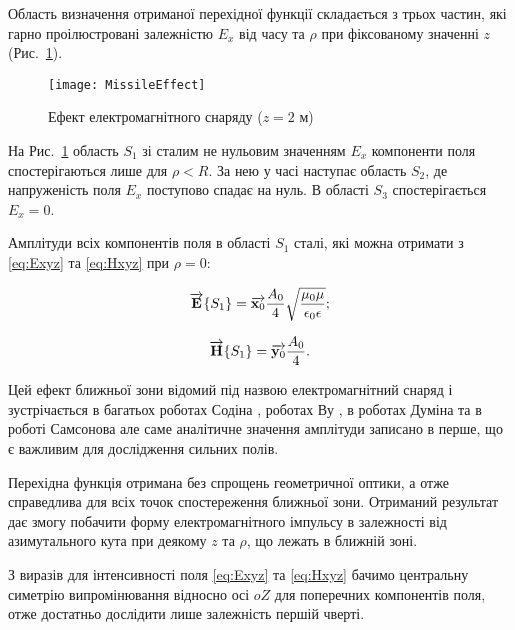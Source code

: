 Область визначення отриманої перехідної функції складається з трьох частин, 
які гарно проілюстровані залежністю $ E_x $ від часу та $ \rho $ при 
фіксованому значенні $ z $ (Рис.~\ref{fig:emp_rho}).
 
\begin{figure}[h] \begin{center}
\texttt{[image: MissileEffect]}
\caption{Ефект електромагнітного снаряду ($ z = 2 $ м)} \label{fig:emp_rho}
\end{center} \end{figure}

На Рис.~\ref{fig:emp_rho} область $ S_1 $ зі сталим не нульовим значенням 
$ E_x $ компоненти поля спостерігаються лише для $ \rho < R $. За нею у 
часі наступає область $ S_2 $, де напруженість поля $ E_x $ поступово спадає 
на нуль. В області $ S_3 $ спостерігається $ E_x = 0 $.

Амплітуди всіх компонентів поля в області $ S_1 $ сталі, які можна отримати
з \eqref{eq:Exyz} та \eqref{eq:Hxyz} при $ \rho = 0 $:

\begin{equation*} \begin{aligned}
\overrightarrow{\mathbf E} \{ S_1 \} = 
\overrightarrow{\mathbf x_0} \frac{A_0}{4} 
\sqrt{\frac{\mu_0 \mu}{\epsilon_0 \epsilon}};
\end{aligned} \end{equation*}

\begin{equation*} \begin{aligned}
\overrightarrow{\mathbf H} \{ S_1 \} = \overrightarrow{\mathbf y_0} \frac{A_0}{4}.
\end{aligned} \end{equation*}

Цей ефект ближньої зони відомий під назвою електромагнітний снаряд і
зустрічається в багатьох роботах Содіна \cite{imp:Sodin1991, 
imp:Sodin1992-5, imp:Sodin1992-10, imp:Sodin1997}, роботах Ву 
\cite{imp:Wu1985, imp:Wu1987, imp:Wu1991}, в роботах Думіна
\cite{imp:Dumin1996} та в роботі Самсонова \cite{imp:Samsonov1986} але 
саме аналітичне значення амплітуди записано в перше, що є важливим для 
дослідження сильних полів.

Перехідна функція отримана без спрощень геометричної оптики, а отже 
справедлива для всіх точок спостереження ближньої зони. Отриманий результат 
дає змогу побачити форму електромагнітного імпульсу в залежності від 
азимутального кута при деякому $ z $ та $ \rho $, що лежать в ближній зоні.

З виразів для інтенсивності поля \eqref{eq:Exyz} та \eqref{eq:Hxyz} бачимо
центральну симетрію випромінювання відносно осі $ oZ $ для поперечних 
компонентів поля, отже достатньо дослідити лише залежність першій чверті.

